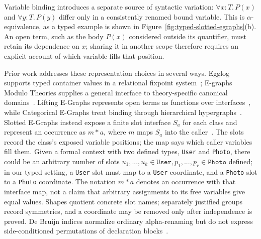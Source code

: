 Variable binding introduces a separate source of syntactic variation:
$\forall x{:}T.\,P(x)$ and $\forall y{:}T.\,P(y)$ differ only in a
consistently renamed bound variable. This is $\alpha$-equivalence, as a typed example is
shown in Figure~\ref{fig:typed-slotted-egraphs}(b). An open
term, such as the body $P(x)$ considered outside its quantifier, must retain
its dependence on $x$; sharing it in another scope therefore requires an
explicit account of which variable fills that position.

Prior work addresses these representation choices in several ways.
Egglog supports typed container values in a relational fixpoint
system~\cite{egglog,egglog_software}; E-graphs Modulo Theories supplies a
general interface to theory-specific canonical
domains~\cite{zucker2025omeletsneedonionsegraphs}. Lifting E-Graphs represents open
terms as functions over interfaces~\cite{zucker2026lifting}, while
Categorical E-Graphs treat binding through hierarchical
hypergraphs~\cite{egBindings}. Slotted E-Graphs instead expose a finite slot interface
$S_a$ for each class and represent an occurrence as $m*a$, where $m$ maps
$S_a$ into the caller~\cite{slottedEGraphs}. The slots record the class's
exposed variable positions; the map says which caller variables fill them.
Given a formal context with two defined types, \texttt{User} and \texttt{Photo}, 
there could be an arbitrary number of slots $u_1,...,u_k\in\texttt{User}, p_1,...,p_r\in\texttt{Photo}$
defined; 
in our typed setting, a \texttt{User} slot must map to a \texttt{User}
coordinate, and a \texttt{Photo} slot to a \texttt{Photo} coordinate.
The notation $m*a$ denotes an occurrence with that interface map, not a
claim that arbitrary assignments to its free variables give equal values.
Shapes quotient concrete slot
names; separately justified groups record symmetries, and a coordinate may be
removed only after independence is proved. De Bruijn indices normalize
ordinary alpha-renaming but do not express side-conditioned
permutations of declaration blocks~\cite{deBruijn,maziarz2021HashingAlpha}.


